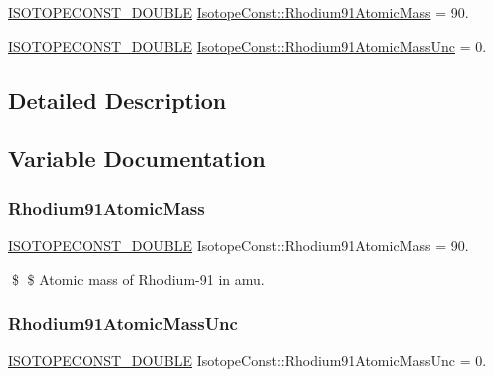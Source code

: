 \begin{DoxyCompactItemize}
\item 
\mbox{\hyperlink{group___isotope_const-_macros_ga8f45a7272ce02c0b4c65c44636ed719a}{I\+S\+O\+T\+O\+P\+E\+C\+O\+N\+S\+T\+\_\+\+D\+O\+U\+B\+LE}} \mbox{\hyperlink{group___isotope_const-_rhodium-_rh91_ga1759b64ad0e2a731bc8a6c992a5848d4}{Isotope\+Const\+::\+Rhodium91\+Atomic\+Mass}} = 90.
\item 
\mbox{\hyperlink{group___isotope_const-_macros_ga8f45a7272ce02c0b4c65c44636ed719a}{I\+S\+O\+T\+O\+P\+E\+C\+O\+N\+S\+T\+\_\+\+D\+O\+U\+B\+LE}} \mbox{\hyperlink{group___isotope_const-_rhodium-_rh91_ga64b2e57b636038852f34185dba334e22}{Isotope\+Const\+::\+Rhodium91\+Atomic\+Mass\+Unc}} = 0.
\end{DoxyCompactItemize}


\subsection{Detailed Description}


\subsection{Variable Documentation}
\mbox{\label{group___isotope_const-_rhodium-_rh91_ga1759b64ad0e2a731bc8a6c992a5848d4}} 
\subsubsection{\texorpdfstring{Rhodium91\+Atomic\+Mass}{Rhodium91AtomicMass}}
{\footnotesize\ttfamily \mbox{\hyperlink{group___isotope_const-_macros_ga8f45a7272ce02c0b4c65c44636ed719a}{I\+S\+O\+T\+O\+P\+E\+C\+O\+N\+S\+T\+\_\+\+D\+O\+U\+B\+LE}} Isotope\+Const\+::\+Rhodium91\+Atomic\+Mass = 90.}

\$ \$ Atomic mass of Rhodium-\/91 in amu. \mbox{\label{group___isotope_const-_rhodium-_rh91_ga64b2e57b636038852f34185dba334e22}} 
\subsubsection{\texorpdfstring{Rhodium91\+Atomic\+Mass\+Unc}{Rhodium91AtomicMassUnc}}
{\footnotesize\ttfamily \mbox{\hyperlink{group___isotope_const-_macros_ga8f45a7272ce02c0b4c65c44636ed719a}{I\+S\+O\+T\+O\+P\+E\+C\+O\+N\+S\+T\+\_\+\+D\+O\+U\+B\+LE}} Isotope\+Const\+::\+Rhodium91\+Atomic\+Mass\+Unc = 0.}

